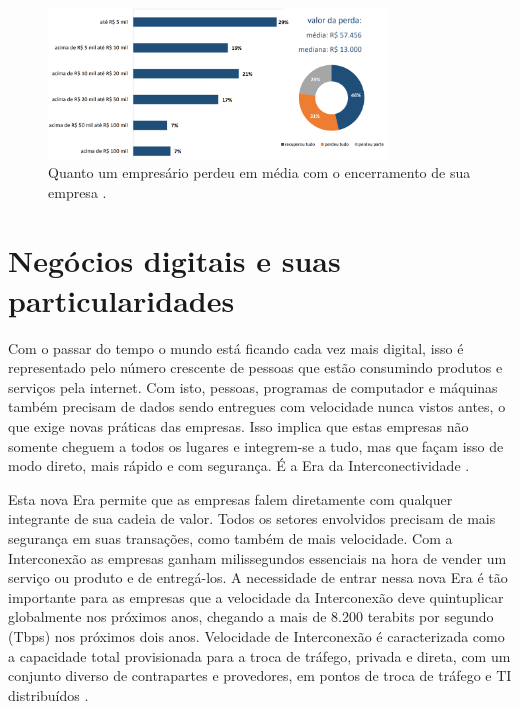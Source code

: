 \begin{figure}[H]
 \centering
  \includegraphics[width=0.80\textwidth]{./fig/valordoprejuizo}
 \caption{Quanto um empresário perdeu em média com o encerramento de sua empresa \cite{sebraesp}.}
 \label{fig:fracasso}
\end{figure}

\section{Negócios digitais e suas particularidades}
\label{sec:carac}

Com o passar do tempo o mundo está ficando cada vez mais digital, isso é representado pelo número crescente de pessoas que estão consumindo produtos e serviços pela internet. Com isto, pessoas, programas de computador e máquinas também precisam de dados sendo entregues com velocidade nunca vistos antes, o que exige novas práticas das empresas. Isso implica que estas empresas não somente cheguem a todos os lugares e integrem-se a tudo, mas que façam isso de modo direto, mais rápido e com segurança. É a Era da Interconectividade \cite{negdig2019}.

Esta nova Era permite que as empresas falem diretamente com qualquer integrante de sua cadeia de valor. Todos os setores envolvidos precisam de mais segurança em suas transações, como também de mais velocidade. Com a Interconexão as empresas ganham milissegundos essenciais na hora de vender um serviço ou produto e de entregá-los. A necessidade de entrar nessa nova Era é tão importante para as empresas que a velocidade da Interconexão deve quintuplicar globalmente nos próximos anos, chegando a mais de 8.200 terabits por segundo (Tbps) nos próximos dois anos. Velocidade de Interconexão é caracterizada como a capacidade total provisionada para a troca de tráfego, privada e direta, com um conjunto diverso de contrapartes e provedores, em pontos de troca de tráfego e TI distribuídos \cite{negdig2019}.

